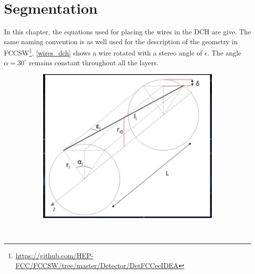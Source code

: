 \appendix
\section{Segmentation}

In this chapter, the equations used for placing the wires in the DCH are give. The same naming convention is as well used for the description of the geometry in FCCSW\footnote{\href{https://github.com/HEP-FCC/FCCSW/tree/master/Detector/DetFCCeeIDEA}{https://github.com/HEP-FCC/FCCSW/tree/master/Detector/DetFCCeeIDEA}}. \cref{wires_dch} shows a wire rotated with a stereo angle of $\epsilon$. The angle $\alpha = 30^{\circ}$ remains constant throughout all the layers.


\begin{figure}[ht]
  \begin{subfigure}[b]{0.49\textwidth}
	   \centering
	   \includegraphics[width=\textwidth]{figures/wires_DCH.png}%
     \caption{}
     \label{fig_wire_3d}
  \end{subfigure}~
  \begin{subfigure}[b]{0.49\textwidth}
	   \centering
\end{subfigure}
\end{figure}
